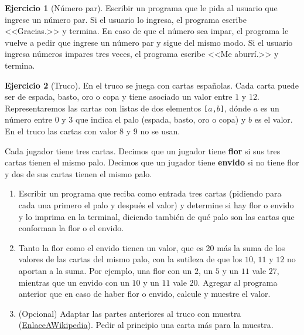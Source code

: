 \documentclass[a4paper,12pt]{book}
\theoremstyle{definition}
\newtheorem{ejercicio}{Ejercicio}
\begin{document}
	\begin{ejercicio}[Número par]
		Escribir un programa que le pida al usuario que ingrese un número par. Si el usuario lo ingresa, el programa escribe <<Gracias.>> y termina. En caso de que el número sea impar, el programa le vuelve a pedir que ingrese un número par y sigue del mismo modo. Si el usuario ingresa números impares tres veces, el programa escribe <<Me aburrí.>> y termina.
	\end{ejercicio}
	
	\begin{ejercicio}[Truco]
		En el truco se juega con cartas españolas. Cada carta puede ser de espada, basto, oro o copa y tiene asociado un valor entre $1$ y $12$. Representaremos las cartas con listas de dos elementos {\tt [$a$,$b$]}, dónde $a$ es un número entre $0$ y $3$ que indica el palo (espada, basto, oro o copa) y $b$ es el valor. En el truco las cartas con valor $8$ y $9$ no se usan.
		
		Cada jugador tiene tres cartas. Decimos que un jugador tiene {\bf flor} si sus tres cartas tienen el mismo palo. Decimos que un jugador tiene {\bf envido} si no tiene flor y dos de sus cartas tienen el mismo palo.
		
		\begin{enumerate}
			\item Escribir un programa que reciba como entrada tres cartas (pidiendo para cada una primero el palo y después el valor) y determine si hay flor o envido y lo imprima en la terminal, diciendo también de qué palo son las cartas que conforman la flor o el envido.
			
			\item Tanto la flor como el envido tienen un valor, que es 20 más la suma de los valores de las cartas del mismo palo, con la sutileza de que los $10$, $11$ y $12$ no aportan a la suma. Por ejemplo, una flor con un $2$, un $5$ y un $11$ vale $27$, mientras que un envido con un $10$ y un $11$ vale $20$. Agregar al programa anterior que en caso de haber flor o envido, calcule y muestre el valor.
			
			\item (Opcional) Adaptar las partes anteriores al truco con muestra (\href{https://es.wikipedia.org/wiki/Truco_uruguayo}{EnlaceAWikipedia}). Pedir al principio una carta más para la muestra.
		\end{enumerate}
	\end{ejercicio}
	
\end{document}
